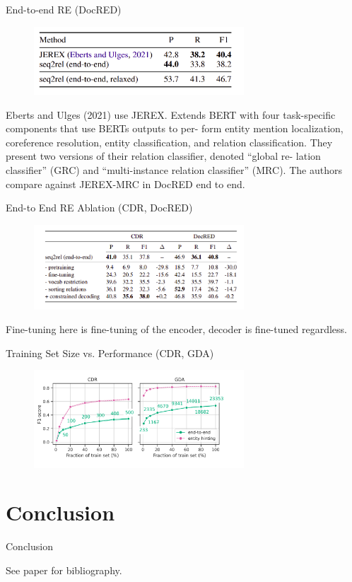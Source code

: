 \documentclass[usenames,dvipsnames,pdf]{beamer}
\begin{document}
        \begin{frame}{End-to-end RE (DocRED)}
          \begin{figure}
            \includegraphics[width=0.7\textwidth,height=0.7\textheight,keepaspectratio]{DocRED_e2e_comparison} 
          \end{figure}

          Eberts and Ulges (2021) use JEREX.
          Extends BERT with four task-specific
          components that use BERTs outputs to per-
          form entity mention localization, coreference
          resolution, entity classification, and relation
          classification. They present two versions of
          their relation classifier, denoted “global re-
          lation classifier” (GRC) and “multi-instance
          relation classifier” (MRC). The authors compare against
          JEREX-MRC in DocRED end to end.
        \end{frame}


        \begin{frame}{End-to End RE Ablation (CDR, DocRED)}
          \begin{figure}
            \includegraphics[width=0.7\textwidth,height=0.7\textheight,keepaspectratio]{ablation} 
          \end{figure}
          Fine-tuning here is fine-tuning of the encoder, decoder is fine-tuned regardless.  
        \end{frame}

        \begin{frame}{Training Set Size vs. Performance (CDR, GDA)}
          \begin{figure}
            \includegraphics[width=0.7\textwidth,height=0.7\textheight,keepaspectratio]{training_set_size_plateau} 
          \end{figure}
        \end{frame}
        
        \section{Conclusion}

        \begin{frame}{Conclusion}


          See paper for bibliography.
        \end{frame}
      
\end{document}
